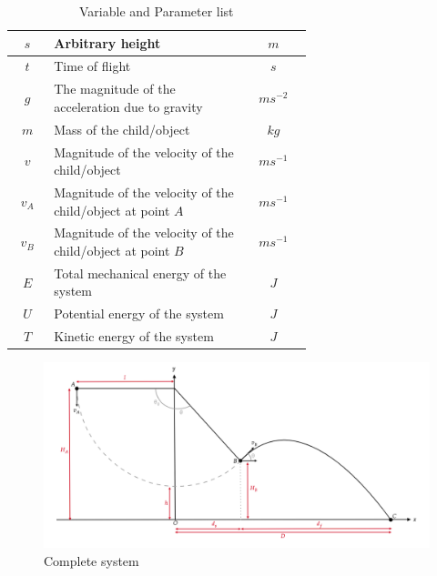 \documentclass{article}
\begin{document}
\begin{table}[H]
\begin{tabular}{|c|>{\raggedright\arraybackslash}p{0.65\linewidth}|c|}
$s$     & Arbitrary height      &$m$        \\  \hline
$t$       & Time of flight                                                                         & $s$        \\ \hline
$g$       & The magnitude of the acceleration due to gravity                                       & $ms^{-2}$  \\ \hline
$m$       & Mass of the child/object                                                               & $kg$       \\ \hline
$v$       & Magnitude of the velocity of the child/object                                          & $ms^{-1}$  \\ \hline
$v_A$       & Magnitude of the velocity of the child/object at point $A$                                          & $ms^{-1}$  \\ \hline
$v_B$       & Magnitude of the velocity of the child/object at point $B$                                         & $ms^{-1}$  \\ \hline
$E$       & Total mechanical energy of the system                                                  & $J$        \\ \hline
$U$       & Potential energy of the system                                                         & $J$        \\ \hline
$T$       & Kinetic energy of the system                                                           & $J$        \\ \hline
\end{tabular}
\caption{Variable and Parameter list}
\label{tab:my_table}
\end{table}

\begin{figure}[ht]
    \centering
    \includegraphics[width=1.00\linewidth]{Fig 1.png}
    \caption{Complete system}
    \label{fig: Swing diagram}
\end{figure}
\end{document}
